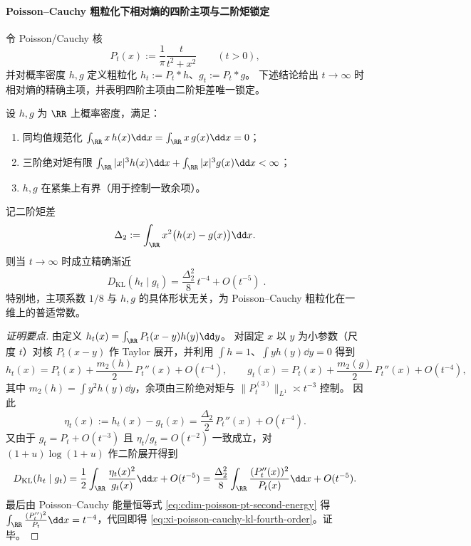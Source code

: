 \paragraph{Poisson--Cauchy 粗粒化下相对熵的四阶主项与二阶矩锁定}\label{par:xi-poisson-cauchy-kl-fourth-order}
令 Poisson/Cauchy 核
\[
P_t(x):=\frac{1}{\pi}\frac{t}{t^2+x^2}\qquad(t>0),
\]
并对概率密度 \(h,g\) 定义粗粒化 \(h_t:=P_t*h\)、\(g_t:=P_t*g\)。
下述结论给出 \(t\to\infty\) 时相对熵的精确主项，并表明四阶主项由二阶矩差唯一锁定。

\begin{theorem}\label{thm:xi-poisson-cauchy-kl-fourth-order-universality}
设 \(h,g\) 为 \(\RR\) 上概率密度，满足：
\begin{enumerate}
  \item 同均值规范化 \(\int_{\RR}x\,h(x)\dd x=\int_{\RR}x\,g(x)\dd x=0\)；
  \item 三阶绝对矩有限 \(\int_{\RR}|x|^3h(x)\dd x+\int_{\RR}|x|^3g(x)\dd x<\infty\)；
  \item \(h,g\) 在紧集上有界（用于控制一致余项）。
\end{enumerate}
记二阶矩差
\[
\Delta_2:=\int_{\RR}x^2\bigl(h(x)-g(x)\bigr)\dd x.
\]
则当 \(t\to\infty\) 时成立精确渐近
\begin{equation}\label{eq:xi-poisson-cauchy-kl-fourth-order}
\boxed{\;
D_{\mathrm{KL}}(h_t\mid g_t)
=\frac{\Delta_2^2}{8}\,t^{-4}+O(t^{-5})\; }.
\end{equation}
特别地，主项系数 \(1/8\) 与 \(h,g\) 的具体形状无关，为 Poisson--Cauchy 粗粒化在一维上的普适常数。
\end{theorem}

\begin{proof}[证明要点]
由定义 \(h_t(x)=\int_{\RR}P_t(x-y)h(y)\dd y\)。
对固定 \(x\) 以 \(y\) 为小参数（尺度 \(t\)）对核 \(P_t(x-y)\) 作 Taylor 展开，并利用 \(\int h=1\)、\(\int yh(y)\dd y=0\) 得到
\[
h_t(x)=P_t(x)+\frac{m_2(h)}{2}\,P_t''(x)+O(t^{-4}),
\qquad
g_t(x)=P_t(x)+\frac{m_2(g)}{2}\,P_t''(x)+O(t^{-4}),
\]
其中 \(m_2(h)=\int y^2h(y)\dd y\)，余项由三阶绝对矩与 \(\|P_t^{(3)}\|_{L^1}\asymp t^{-3}\) 控制。
因此
\[
\eta_t(x):=h_t(x)-g_t(x)=\frac{\Delta_2}{2}\,P_t''(x)+O(t^{-4}).
\]
又由于 \(g_t=P_t+O(t^{-3})\) 且 \(\eta_t/g_t=O(t^{-2})\) 一致成立，对 \((1+u)\log(1+u)\) 作二阶展开得到
\[
D_{\mathrm{KL}}(h_t\mid g_t)
=\frac12\int_{\RR}\frac{\eta_t(x)^2}{g_t(x)}\dd x+O(t^{-5})
=\frac{\Delta_2^2}{8}\int_{\RR}\frac{(P_t''(x))^2}{P_t(x)}\dd x+O(t^{-5}).
\]
最后由 Poisson--Cauchy 能量恒等式 \eqref{eq:cdim-poisson-pt-second-energy} 得
\(
\int_{\RR}\frac{(P_t'')^2}{P_t}\dd x=t^{-4}
\)，代回即得 \eqref{eq:xi-poisson-cauchy-kl-fourth-order}。证毕。
\end{proof}

